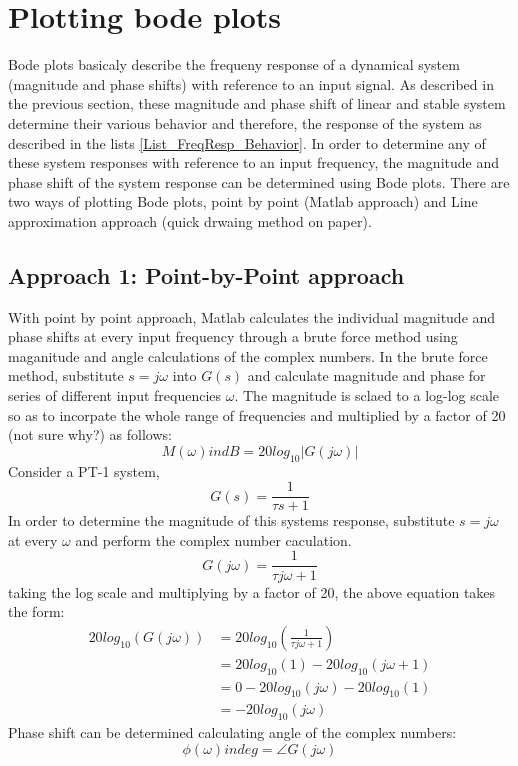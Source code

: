 \section{Plotting bode plots}

Bode plots basicaly describe the frequeny response of a dynamical system (magnitude and phase shifts) with reference to an input signal. As described in the previous section, these magnitude and phase shift of linear and stable system determine their various behavior and therefore, the response of the system as described in the lists \ref{List_FreqResp_Behavior}. In order to determine any of these system responses with reference to an input frequency, the magnitude and phase shift of the system response can be determined using Bode plots. There are two ways of plotting Bode plots, point by point (Matlab approach) and Line approximation approach (quick drwaing method on paper).

\subsection{Approach 1: Point-by-Point approach}

With point by point approach, Matlab calculates the individual magnitude and phase shifts at every input frequency through a brute force method using maganitude and angle calculations of the complex numbers. In the brute force method, substitute $s = j\omega$ into $G(s)$ and calculate magnitude and phase for series of different input frequencies $\omega$. The magnitude is sclaed to a log-log scale so as to incorpate the whole range of frequencies and multiplied by a factor of 20 (not sure why?) as follows:
\begin{equation}
	M (\omega) in dB = 20 log_{10}|G(j \omega)|
\end{equation}
Consider a PT-1 system,
\begin{equation}
	G(s) = \frac{1}{\tau s + 1}
\end{equation}
In order to determine the magnitude of this systems response, substitute $s = j \omega$ at every $\omega$ and perform the complex number caculation.
\begin{equation}
	G(j\omega) = \frac{1}{\tau j \omega + 1}
\end{equation}
taking the log scale and multiplying by a factor of 20, the above equation takes the form:
\begin{align*}
	20 log_{10} (G(j \omega)) &= 20 log_{10} \left( \frac{1}{\tau j \omega + 1} \right) \\
								&= 	20 log_{10} (1) - 20 log_{10} (j \omega + 1) \\
								&= 0 - 20 log_{10} (j \omega) - 20 log_{10} (1) \\
								&= - 20 log_{10} (j \omega)
\end{align*}
Phase shift can be determined calculating angle of the complex numbers:
\begin{equation}
	\phi (\omega) in deg = \angle G(j \omega)
\end{equation}

